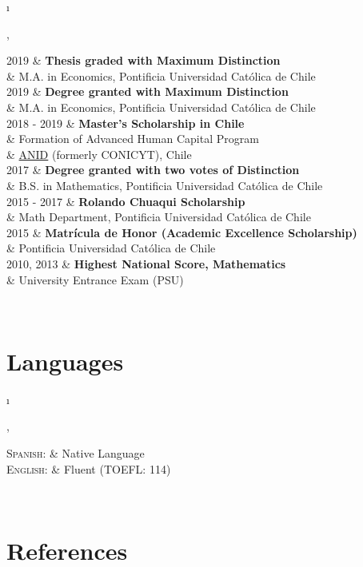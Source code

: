 \documentclass[a4paper, 10pt]{article}
\newcommand{\tablength}{}
\newcommand{\setTabParams}[1]{\renewcommand\tablength{}\forcsvlist{\listadd\tablength}{#1}}
\newcommand{\setCols}[1]{			%
	\ifnum0=\i						%
		\ifdim0cm=#1				%
			\def \firstCol {r}		%
		\else						%
			\def \firstCol {p{#1}}	%
		\fi							%
	\else \ifnum1=\i				%
		\ifdim0cm=#1				%
			\def \secondCol {l}		%
		\else						%
			\def \secondCol{p{#1}}	%
		\fi							%
	\else \ifnum2=\i				%
		\ifnum0=#1					%
			\def \sep {}			%
		\else						%
			\def \sep {|}			%
		\fi							%
	\fi \fi \fi						%
	\advance\i by1					%
}
\newcommand{\tab}[1]{							%
	\newcount\i									%
	\forlistloop{\setCols}{\tablength}			%
	\begin{tabular}{\firstCol \sep \secondCol}	%
		#1										%
	\end{tabular} \\[.5ex]						%
}
\begin{document}
\tab{
\textsc{2019}
	&	\textbf{Thesis graded with Maximum Distinction}				\\[0.2ex]
	&	M.A. in Economics, Pontificia Universidad Católica de Chile		\\[2ex]

\textsc{2019}
	&	\textbf{Degree granted with Maximum Distinction}			\\[0.2ex]
	&	M.A. in Economics, Pontificia Universidad Católica de Chile		\\[2ex]

\textsc{2018 - 2019} 
	&	\textbf{Master's Scholarship in Chile}						\\[0.2ex]
	&	Formation of Advanced Human Capital Program				\\[0.2ex]
	&	\href{https://www.anid.cl}{ANID} (formerly CONICYT), Chile		\\[2ex]
	
\textsc{2017}
	&	\textbf{Degree granted with two votes of Distinction}			\\[0.2ex]
	&	B.S. in Mathematics, Pontificia Universidad Católica de Chile	\\[2ex]

\textsc{2015 - 2017} 
	&	\textbf{Rolando Chuaqui Scholarship}						\\[0.2ex]
	&	Math Department, Pontificia Universidad Católica de Chile		\\[2ex]
	
\textsc{2015}
	&	\textbf{Matrícula de Honor (Academic Excellence Scholarship)}	\\[0.2ex]
	&	Pontificia Universidad Católica de Chile						\\[2ex]

\textsc{2010, 2013}
	&	\textbf{Highest National Score, Mathematics}				\\[0.2ex]
	&	 University Entrance Exam (PSU)							\\	
}

\section{Languages}
\setTabParams{0cm,0cm,0}

\tab{
\textsc{Spanish:} 
	&	Native Language	\\[0.2ex]

\textsc{English:}
	&	Fluent (TOEFL: 114)
}

\section{References}
\setTabParams{0cm,0cm,0}
\end{document}
